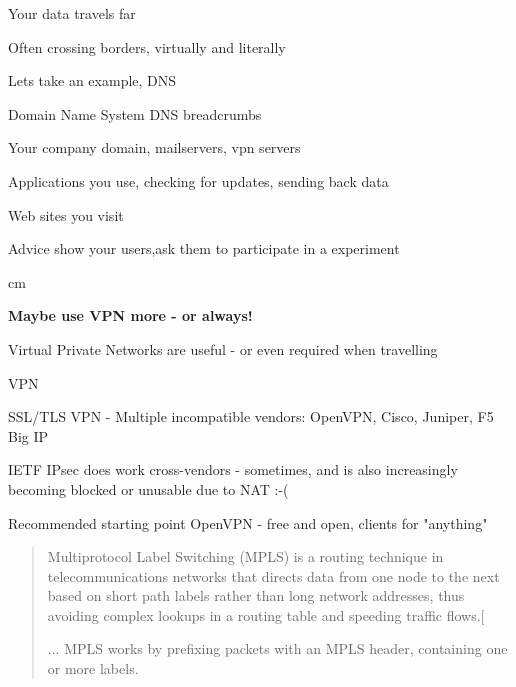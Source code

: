 \documentclass[Screen16to9,17pt]{foils}
\begin{document}


\begin{list2}
\item Your data travels far
\item Often crossing borders, virtually and literally
\end{list2}


\begin{list1}
\item Lets take an example, DNS
\item Domain Name System DNS breadcrumbs
\begin{list2}
\item Your company domain, mailservers, vpn servers
\item Applications you use, checking for updates, sending back data
\item Web sites you visit
\end{list2}
\vskip 1cm
\item Advice show your users,ask them to participate in a experiment
\end{list1}


 cm
\centerline{\bf\Large Maybe use VPN more - or always!}



\begin{list1}
\item Virtual Private Networks are useful - or even required when travelling
\item VPN 
\item SSL/TLS VPN - Multiple incompatible vendors: OpenVPN, Cisco, Juniper, F5 Big IP
\item IETF IPsec does work cross-vendors - sometimes, and is also increasingly becoming blocked or unusable due to NAT :-(
\item Recommended starting point OpenVPN - free and open, clients for "anything"
\end{list1}


\begin{quote}
Multiprotocol Label Switching (MPLS) is a routing technique in telecommunications networks that directs data from one node to the next based on short path labels rather than long network addresses, thus avoiding complex lookups in a routing table and speeding traffic flows.[

...
MPLS works by prefixing packets with an MPLS header, containing one or more labels.
\end{quote}
\end{document}
